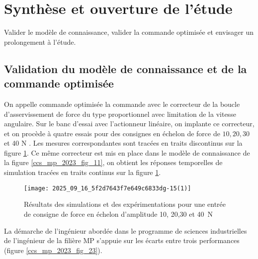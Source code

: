 \section{Synthèse et ouverture de l'étude}
\begin{obj}
Valider le modèle de connaissance, valider la commande optimisée et envisager un prolongement à l'étude.
\end{obj}

\subsection{Validation du modèle de connaissance et de la commande optimisée}%
\ifprof
\else

On appelle commande optimisée la commande avec le correcteur de la boucle d'asservissement de force du type proportionnel avec limitation de la vitesse angulaire. Sur le banc d'essai avec l'actionneur linéaire, on implante ce correcteur, et on procède à quatre essais pour des consignes en échelon de force de $10,20,30$ et 40 N . Les mesures correspondantes sont tracées en traits discontinus sur la figure \ref{ccs_mp_2023_fig_22}. Ce même correcteur est mis en place dans le modèle de connaissance de la figure \ref{ccs_mp_2023_fig_11}, on obtient les réponses temporelles de simulation tracées en traits continus sur la figure \ref{ccs_mp_2023_fig_22}.


\begin{figure}[!h]
\centering
\texttt{[image: 2025\_09\_16\_5f2d7643f7e649c6833dg-15(1)]}
\caption{\label{ccs_mp_2023_fig_22}   Résultats des simulations et des expérimentations pour une entrée de consigne de force en échelon d'amplitude 10, 20,30 et \SI{40}{N}}
\end{figure}



La démarche de l'ingénieur abordée dans le programme de sciences industrielles de l'ingénieur de la filière MP s'appuie sur les écarts entre trois performances (figure \ref{ccs_mp_2023_fig_23}).

